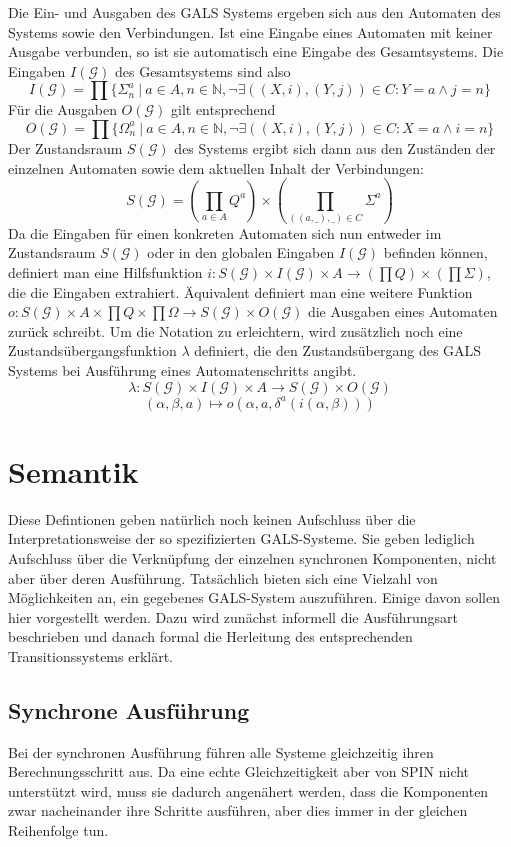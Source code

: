Die Ein- und Ausgaben des GALS Systems ergeben sich aus den Automaten des Systems sowie den Verbindungen.
Ist eine Eingabe eines Automaten mit keiner Ausgabe verbunden, so ist sie automatisch eine Eingabe des Gesamtsystems.
Die Eingaben $I(\mathcal{G})$ des Gesamtsystems sind also
\[ I(\mathcal{G}) = \prod \{ \Sigma^a_n\ |\ a\in A, n\in \mathbb{N}, \lnot\exists ((X,i),(Y,j))\in C: Y=a\land j=n \} \]
Für die Ausgaben $O(\mathcal{G})$ gilt entsprechend
\[ O(\mathcal{G}) = \prod \{ \Omega^a_n\ |\ a\in A, n\in \mathbb{N}, \lnot\exists ((X,i),(Y,j))\in C: X=a\land i=n \} \]
Der Zustandsraum $S(\mathcal{G})$ des Systems ergibt sich dann aus den Zuständen der einzelnen Automaten sowie dem aktuellen Inhalt der Verbindungen:
\[ S(\mathcal{G}) = \left(\prod_{a\in A} Q^a\right)\times\left(\prod_{((a,\_),\_)\in C} \Sigma^a\right) \]
Da die Eingaben für einen konkreten Automaten sich nun entweder im Zustandsraum $S(\mathcal{G})$ oder in den globalen Eingaben $I(\mathcal{G})$ befinden können, definiert man eine Hilfsfunktion $i : S(\mathcal{G})\times I(\mathcal{G})\times A\rightarrow (\prod Q)\times(\prod\Sigma)$, die die Eingaben extrahiert.
Äquivalent definiert man eine weitere Funktion $o : S(\mathcal{G})\times A\times\prod Q\times\prod\Omega\rightarrow S(\mathcal{G})\times O(\mathcal{G})$ die Ausgaben eines Automaten zurück schreibt.
Um die Notation zu erleichtern, wird zusätzlich noch eine Zustandsübergangsfunktion $\lambda$ definiert, die den Zustandsübergang des GALS Systems bei Ausführung eines Automatenschritts angibt.
\[ \lambda : S(\mathcal{G})\times I(\mathcal{G})\times A\rightarrow S(\mathcal{G})\times O(\mathcal{G}) \]
\[ (\alpha,\beta,a) \mapsto o(\alpha,a,\delta^a(i(\alpha,\beta))) \]

\section{Semantik}
Diese Defintionen geben natürlich noch keinen Aufschluss über die Interpretationsweise der so spezifizierten GALS-Systeme.
Sie geben lediglich Aufschluss über die Verknüpfung der einzelnen synchronen Komponenten, nicht aber über deren Ausführung.
Tatsächlich bieten sich eine Vielzahl von Möglichkeiten an, ein gegebenes GALS-System auszuführen.
Einige davon sollen hier vorgestellt werden.
Dazu wird zunächst informell die Ausführungsart beschrieben und danach formal die Herleitung des entsprechenden Transitionssystems erklärt.

\subsection{Synchrone Ausführung}
Bei der synchronen Ausführung führen alle Systeme gleichzeitig ihren Berechnungsschritt aus.
Da eine echte Gleichzeitigkeit aber von SPIN nicht unterstützt wird, muss sie dadurch angenähert werden, dass die Komponenten zwar nacheinander ihre Schritte ausführen, aber dies  immer in der gleichen Reihenfolge tun.


